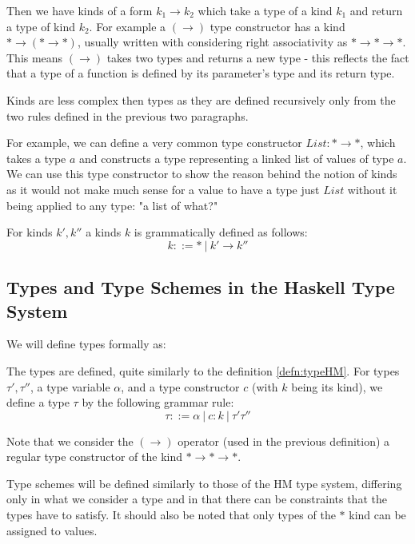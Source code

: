 Then we have kinds of a form $k_1 \rightarrow k_2$ which take a type of a kind $k_1$ and return a type of kind $k_2$. For example a $(\rightarrow)$ type constructor has a kind $* \rightarrow (* \rightarrow *)$, usually written with considering right associativity as $* \rightarrow * \rightarrow *$. This means $(\rightarrow)$ takes two types and returns a new type - this reflects the fact that a type of a function is defined by its parameter's type and its return type.

Kinds are less complex then types as they are defined recursively only from the two rules defined in the previous two paragraphs.

For example, we can define a very common type constructor $List: * \rightarrow *$, which takes a type $a$ and constructs a type representing a linked list of values of type $a$. We can use this type constructor to show the reason behind the notion of kinds as it would not make much sense for a value to have a type just $List$ without it being applied to any type: "a list of what?"

\begin{defn}[Kinds]
    For kinds $k', k''$ a kinds $k$ is grammatically defined as follows:
    $$k ::= *\ |\ k' \rightarrow k''$$
\end{defn}

\subsection{Types and Type Schemes in the Haskell Type System}

We will define types formally as:

\begin{defn}
    The types are defined, quite similarly to the definition \ref{defn:typeHM}. For types $\tau', \tau''$, a type variable $\alpha$, and a type constructor $c$ (with $k$ being its kind), we define a type $\tau$ by the following grammar rule:
    $$\tau ::= \alpha \ |\ c : k\ |\ \tau' \tau''$$

    Note that we consider the $(\rightarrow)$ operator (used in the previous definition) a regular type constructor of the kind $* \rightarrow * \rightarrow *$.
\end{defn}

Type schemes will be defined similarly to those of the HM type system, differing only in what we consider a type and in that there can be constraints that the types have to satisfy. It should also be noted that only types of the $*$ kind can be assigned to values.

